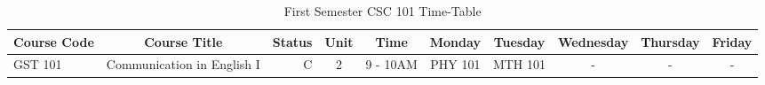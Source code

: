 \documentclass{article}
\begin{document}
\begin{sidewaystable}[h!]
	\begin{center}
		\caption{First Semester CSC 101 Time-Table}
		\label{tab:table1}
		\begin{tabular}{l|c|r|c|c|c|c|c|c|c}
			\textbf{Course Code} & \textbf{Course Title} & \textbf{Status} & \textbf{Unit} & \textbf{Time} & \textbf{Monday} & \textbf{Tuesday} & \textbf{Wednesday} & \textbf{Thursday} & \textbf{Friday}\\
			\hline
			GST 101 & Communication in English I & C & 2 & 9 - 10AM & PHY 101 & MTH 101 & - & - & - \\
		\end{tabular}
	\end{center}
\end{sidewaystable}
\end{document}
